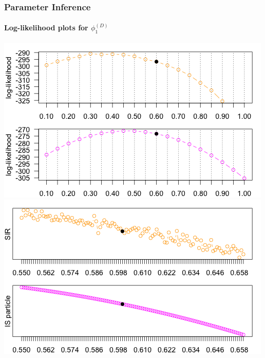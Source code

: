 \documentclass[11pt]{beamer}
\begin{document}
\begin{frame}
\frametitle{Parameter Inference}
\framesubtitle{Log-likelihood plots for $\phi_1^{(D)}$}
\centering
\includegraphics[scale=0.30]{hdpm-loglik-Dphi1}
\includegraphics[scale=0.30]{hdpm-loglik-Dphi1-zoom}
\end{frame}
\end{document}

